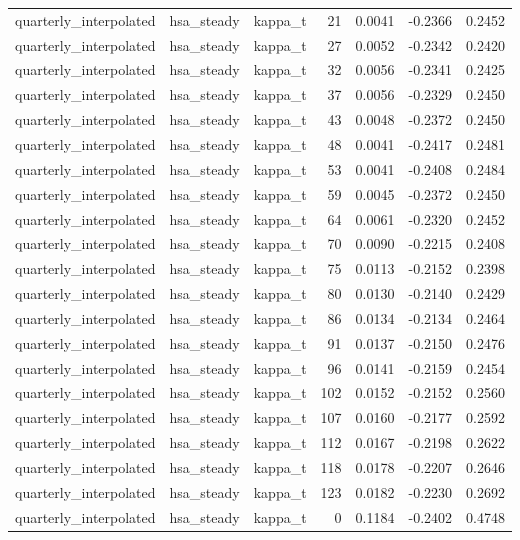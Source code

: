 \begin{tabular}{lllrrrr}
quarterly\_interpolated & hsa\_steady & kappa\_t & 21 & 0.0041 & -0.2366 & 0.2452 \\
quarterly\_interpolated & hsa\_steady & kappa\_t & 27 & 0.0052 & -0.2342 & 0.2420 \\
quarterly\_interpolated & hsa\_steady & kappa\_t & 32 & 0.0056 & -0.2341 & 0.2425 \\
quarterly\_interpolated & hsa\_steady & kappa\_t & 37 & 0.0056 & -0.2329 & 0.2450 \\
quarterly\_interpolated & hsa\_steady & kappa\_t & 43 & 0.0048 & -0.2372 & 0.2450 \\
quarterly\_interpolated & hsa\_steady & kappa\_t & 48 & 0.0041 & -0.2417 & 0.2481 \\
quarterly\_interpolated & hsa\_steady & kappa\_t & 53 & 0.0041 & -0.2408 & 0.2484 \\
quarterly\_interpolated & hsa\_steady & kappa\_t & 59 & 0.0045 & -0.2372 & 0.2450 \\
quarterly\_interpolated & hsa\_steady & kappa\_t & 64 & 0.0061 & -0.2320 & 0.2452 \\
quarterly\_interpolated & hsa\_steady & kappa\_t & 70 & 0.0090 & -0.2215 & 0.2408 \\
quarterly\_interpolated & hsa\_steady & kappa\_t & 75 & 0.0113 & -0.2152 & 0.2398 \\
quarterly\_interpolated & hsa\_steady & kappa\_t & 80 & 0.0130 & -0.2140 & 0.2429 \\
quarterly\_interpolated & hsa\_steady & kappa\_t & 86 & 0.0134 & -0.2134 & 0.2464 \\
quarterly\_interpolated & hsa\_steady & kappa\_t & 91 & 0.0137 & -0.2150 & 0.2476 \\
quarterly\_interpolated & hsa\_steady & kappa\_t & 96 & 0.0141 & -0.2159 & 0.2454 \\
quarterly\_interpolated & hsa\_steady & kappa\_t & 102 & 0.0152 & -0.2152 & 0.2560 \\
quarterly\_interpolated & hsa\_steady & kappa\_t & 107 & 0.0160 & -0.2177 & 0.2592 \\
quarterly\_interpolated & hsa\_steady & kappa\_t & 112 & 0.0167 & -0.2198 & 0.2622 \\
quarterly\_interpolated & hsa\_steady & kappa\_t & 118 & 0.0178 & -0.2207 & 0.2646 \\
quarterly\_interpolated & hsa\_steady & kappa\_t & 123 & 0.0182 & -0.2230 & 0.2692 \\
quarterly\_interpolated & hsa\_steady & kappa\_t & 0 & 0.1184 & -0.2402 & 0.4748 \\

\end{tabular}
